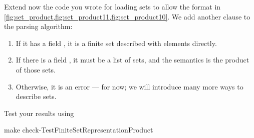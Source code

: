 \begin{codeexercise}
    Extend now the code you wrote for loading sets to allow the format in \cref{fig:set_product,fig:set_product11,fig:set_product10}.
    We add another clause to the parsing algorithm:
    \begin{enumerate}
        \item If it has a field , it is a finite set described with elements directly.
        \item If there is a field , it must be a list of sets, and the semantics is the product of those sets.
        \item Otherwise, it is an error --- for now; we will introduce many more ways to describe sets.
    \end{enumerate}
    Test your results using
    \begin{console}
        make check-TestFiniteSetRepresentationProduct
    \end{console}
\end{codeexercise}
